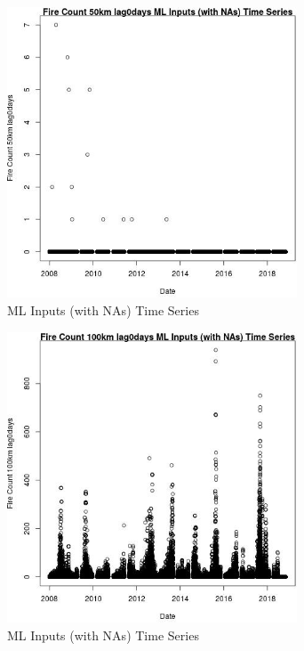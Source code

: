 \begin{figure} 
\centering  
\includegraphics[width=0.77\textwidth]{Code_Outputs/Report_ML_input_PM25_Step4_part_e_de_duplicated_aves_compiled_2019-05-20wNAs_Fire_Count_50km_lag0daysvDate.jpg} 
\caption{\label{fig:Report_ML_input_PM25_Step4_part_e_de_duplicated_aves_compiled_2019-05-20wNAsFire_Count_50km_lag0daysvDate}ML Inputs (with NAs) Time Series} 
\end{figure} 
 

\clearpage 

\begin{figure} 
\centering  
\includegraphics[width=0.77\textwidth]{Code_Outputs/Report_ML_input_PM25_Step4_part_e_de_duplicated_aves_compiled_2019-05-20wNAs_Fire_Count_100km_lag0daysvDate.jpg} 
\caption{\label{fig:Report_ML_input_PM25_Step4_part_e_de_duplicated_aves_compiled_2019-05-20wNAsFire_Count_100km_lag0daysvDate}ML Inputs (with NAs) Time Series} 
\end{figure} 
 

